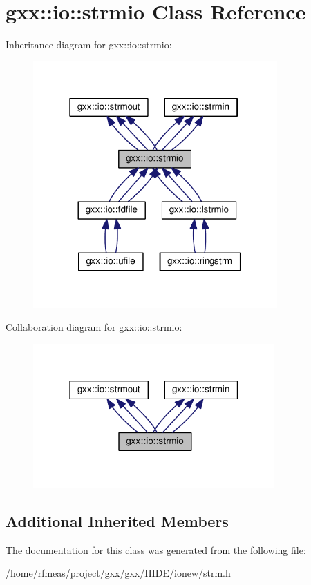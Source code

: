 \hypertarget{classgxx_1_1io_1_1strmio}{}\section{gxx\+:\+:io\+:\+:strmio Class Reference}
\label{classgxx_1_1io_1_1strmio}


Inheritance diagram for gxx\+:\+:io\+:\+:strmio\+:
\nopagebreak
\begin{figure}[H]
\begin{center}
\leavevmode
\includegraphics[width=265pt]{classgxx_1_1io_1_1strmio__inherit__graph}
\end{center}
\end{figure}


Collaboration diagram for gxx\+:\+:io\+:\+:strmio\+:
\nopagebreak
\begin{figure}[H]
\begin{center}
\leavevmode
\includegraphics[width=262pt]{classgxx_1_1io_1_1strmio__coll__graph}
\end{center}
\end{figure}
\subsection*{Additional Inherited Members}


The documentation for this class was generated from the following file\+:\begin{DoxyCompactItemize}
\item 
/home/rfmeas/project/gxx/gxx/\+H\+I\+D\+E/ionew/strm.\+h\end{DoxyCompactItemize}

